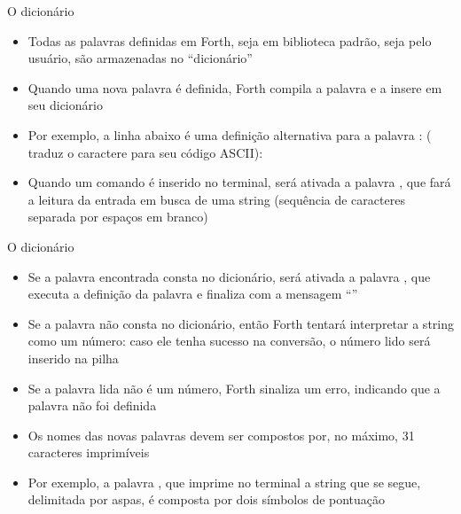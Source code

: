 \begin{frame}[fragile]{O dicionário}

    \begin{itemize}
        \item Todas as palavras definidas em Forth, seja em biblioteca padrão, seja pelo usuário, são
            armazenadas no ``dicionário''

        \item Quando uma nova palavra é definida, Forth compila a palavra e a insere em seu dicionário

        \item Por exemplo, a linha abaixo é uma definição alternativa para a palavra :
            ( traduz o caractere para seu código ASCII):


        \item Quando um comando é inserido no terminal, 
            será ativada a palavra , que fará a leitura da entrada em busca
            de uma string (sequência de caracteres separada por espaços em branco)
    \end{itemize}

\end{frame}

\begin{frame}[fragile]{O dicionário}

    \begin{itemize}
        \item Se a palavra encontrada consta no dicionário,
            será ativada a palavra , que executa a definição da palavra e 
            finaliza com a mensagem ``''

        \item Se a palavra não consta no dicionário, então Forth tentará interpretar a string
            como um número: caso ele tenha sucesso na conversão, o número lido será 
            inserido na pilha

        \item Se a palavra lida não é um número, Forth sinaliza um erro, indicando que a palavra
            não foi definida

        \item Os nomes das novas palavras devem ser compostos por, no máximo, 31 caracteres imprimíveis

        \item Por exemplo, a palavra , que imprime no terminal a string que se segue,
            delimitada por aspas, é composta por dois símbolos de pontuação
    \end{itemize}

\end{frame}

